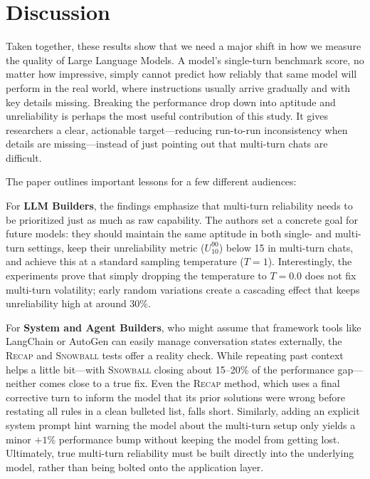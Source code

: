 \documentclass[manuscript,review]{acmart}
\begin{document}
\section{Discussion}
 
Taken together, these results show that we need a major shift in how we measure the quality of Large Language Models. A model's single-turn benchmark score, no matter how impressive, simply cannot predict how reliably that same model will perform in the real world, where instructions usually arrive gradually and with key details missing. Breaking the performance drop down into aptitude and unreliability is perhaps the most useful contribution of this study. It gives researchers a clear, actionable target—reducing run-to-run inconsistency when details are missing—instead of just pointing out that multi-turn chats are difficult.

The paper outlines important lessons for a few different audiences:

For \textbf{LLM Builders}, the findings emphasize that multi-turn reliability needs to be prioritized just as much as raw capability. The authors set a concrete goal for future models: they should maintain the same aptitude in both single- and multi-turn settings, keep their unreliability metric ($U_{10}^{90}$) below 15 in multi-turn chats, and achieve this at a standard sampling temperature ($T=1$). Interestingly, the experiments prove that simply dropping the temperature to $T=0.0$ does not fix multi-turn volatility; early random variations create a cascading effect that keeps unreliability high at around 30\%.

For \textbf{System and Agent Builders}, who might assume that framework tools like LangChain or AutoGen \cite{wu2023autogen} can easily manage conversation states externally, the \textsc{Recap} and \textsc{Snowball} tests offer a reality check. While repeating past context helps a little bit—with \textsc{Snowball} closing about 15--20\% of the performance gap—neither comes close to a true fix. Even the \textsc{Recap} method, which uses a final corrective turn to inform the model that its prior solutions were wrong before restating all rules in a clean bulleted list, falls short. Similarly, adding an explicit system prompt hint warning the model about the multi-turn setup only yields a minor $+1\%$ performance bump without keeping the model from getting lost. Ultimately, true multi-turn reliability must be built directly into the underlying model, rather than being bolted onto the application layer.
\end{document}
